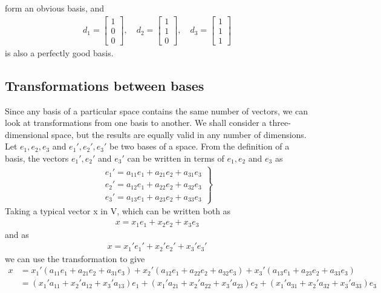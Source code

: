 \documentclass[12pt,a4paper,fleqn]{mycalc}
\begin{document}
	form an obvious basis, and
	\begin{align*}
	d_1=\begin{bmatrix}
	1\\
	0\\
	0
	\end{bmatrix},\quad
	d_2=\begin{bmatrix}
	1\\
	1\\
	0
	\end{bmatrix},\quad
	d_3=\begin{bmatrix}
	1\\
	1\\
	1
	\end{bmatrix}
	\end{align*}
	is also a perfectly good basis. 
	\subsection{Transformations between bases}
	Since any basis of a particular space contains the same number of vectors, we can look at transformations from one basis to another. We shall consider a three-dimensional space, but the results are equally valid in any number of dimensions. Let \( e_1, e_2, e_3 \) and \( e_1', e_2', e_3' \) be two bases of a space. From the definition of a basis, the vectors \( e_1', e_2' \) and \( e_3' \) can be written in terms of \( e_1, e_2 \) and \( e_3 \) as
	\begin{align*}
	\left.
	\begin{matrix}
	e_1'=a_{11}e_1+a_{21}e_2+a_{31}e_3\\
	e_2'=a_{12}e_1+a_{22}e_2+a_{32}e_3\\
	e_3'=a_{13}e_1+a_{23}e_2+a_{33}e_3
	\end{matrix}
	\right\}
	\end{align*}
	Taking a typical vector x in V, which can be written both as
	\begin{align*}
	x=x_{1}e_1+x_{2}e_2+x_{3}e_3
	\end{align*}
	and as
	\begin{align*}
	x=x_{1}'e_1'+x_{2}'e_2'+x_{3}'e_3'
	\end{align*}
	we can use the transformation to give
	\begin{align*}
	x &= x_1'(a_{11}e_1 + a_{21}e_2 + a_{31}e_3) + x_2'(a_{12}e_1 + a_{22}e_2 + a_{32}e_3) + x_3'(a_{13}e_1 + a_{23}e_2 + a_{33}e_3)\\
	&= (x_1'a_{11} + x_2'a_{12} + x_3'a_{13})e_1 + (x_1'a_{21} + x_2'a_{22} + x_3'a_{23})e_2 + (x_1'a_{31} + x_2'a_{32} + x_3'a_{33})e_3
	\end{align*}
\end{document}
